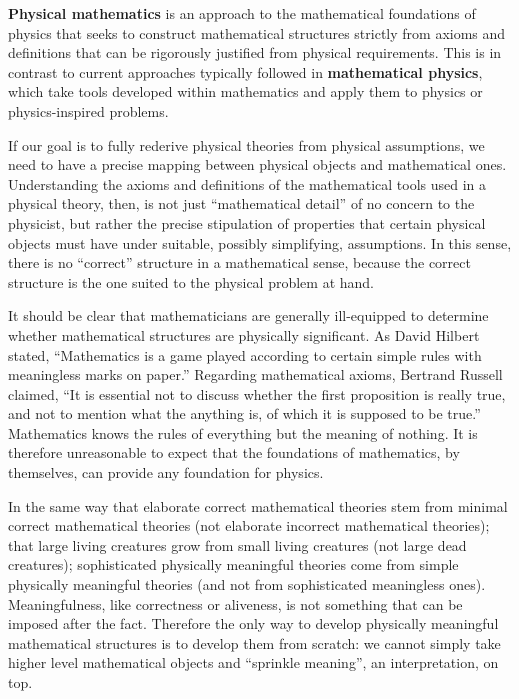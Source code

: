 \documentclass[11pt,letterpaper,fleqn]{memoir} %
\begin{document}
\textbf{Physical mathematics} is an approach to the mathematical foundations of physics that seeks to construct mathematical structures strictly from axioms and definitions that can be rigorously justified from physical requirements. This is in contrast to current approaches typically followed in \textbf{mathematical physics}, which take tools developed within mathematics and apply them to physics or physics-inspired problems.

If our goal is to fully rederive physical theories from physical assumptions, we need to have a precise mapping between physical objects and mathematical ones. Understanding the axioms and definitions of the mathematical tools used in a physical theory, then, is not just ``mathematical detail'' of no concern to the physicist, but rather the precise stipulation of properties that certain physical objects must have under suitable, possibly simplifying, assumptions. In this sense, there is no ``correct'' structure in a mathematical sense, because the correct structure is the one suited to the physical problem at hand.

It should be clear that mathematicians are generally ill-equipped to determine whether mathematical structures are physically significant. As David Hilbert stated, ``Mathematics is a game played according to certain simple rules with meaningless marks on paper.'' Regarding mathematical axioms, Bertrand Russell claimed, ``It is essential not to discuss whether the first proposition is really true, and not to mention what the anything is, of which it is supposed to be true.'' Mathematics knows the rules of everything but the meaning of nothing. It is therefore unreasonable to expect that the foundations of mathematics, by themselves, can provide any foundation for physics.

In the same way that elaborate correct mathematical theories stem from minimal correct mathematical theories (not elaborate incorrect mathematical theories); that large living creatures grow from small living creatures (not large dead creatures); sophisticated physically meaningful theories come from simple physically meaningful theories (and not from sophisticated meaningless ones). Meaningfulness, like correctness or aliveness, is not something that can be imposed after the fact. Therefore the only way to develop physically meaningful mathematical structures is to develop them from scratch: we cannot simply take higher level mathematical objects and ``sprinkle meaning'', an interpretation, on top.
\end{document}
